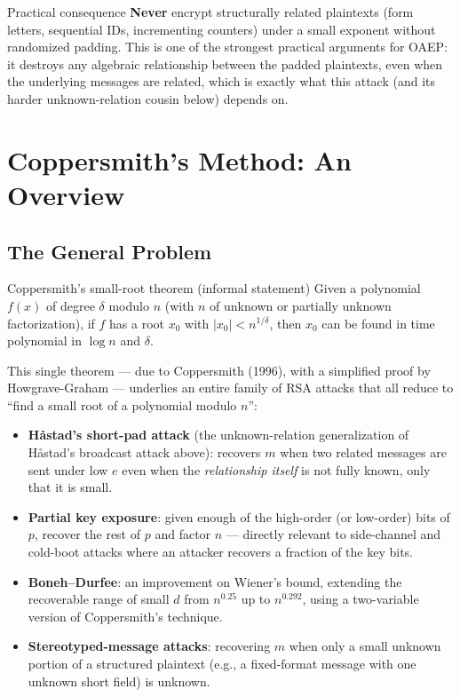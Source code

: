 \begin{warnbox}{Practical consequence}
\textbf{Never} encrypt structurally related plaintexts (form letters, sequential IDs, incrementing counters) under a small exponent without randomized padding. This is one of the strongest practical arguments for OAEP: it destroys any algebraic relationship between the padded plaintexts, even when the underlying messages are related, which is exactly what this attack (and its harder unknown-relation cousin below) depends on.
\end{warnbox}

\newpage
\section{Coppersmith's Method: An Overview}\label{sec:coppersmith}

\subsection{The General Problem}

\begin{keybox}{Coppersmith's small-root theorem (informal statement)}
Given a polynomial $f(x)$ of degree $\delta$ modulo $n$ (with $n$ of unknown or partially unknown factorization), if $f$ has a root $x_0$ with $|x_0| < n^{1/\delta}$, then $x_0$ can be found in time polynomial in $\log n$ and $\delta$.
\end{keybox}

This single theorem — due to Coppersmith (1996), with a simplified proof by Howgrave-Graham — underlies an entire family of RSA attacks that all reduce to ``find a small root of a polynomial modulo $n$'':

\begin{itemize}
\item \textbf{Håstad's short-pad attack} (the unknown-relation generalization of Håstad's broadcast attack above): recovers $m$ when two related messages are sent under low $e$ even when the \emph{relationship itself} is not fully known, only that it is small.
\item \textbf{Partial key exposure}: given enough of the high-order (or low-order) bits of $p$, recover the rest of $p$ and factor $n$ — directly relevant to side-channel and cold-boot attacks where an attacker recovers a fraction of the key bits.
\item \textbf{Boneh--Durfee}: an improvement on Wiener's bound, extending the recoverable range of small $d$ from $n^{0.25}$ up to $n^{0.292}$, using a two-variable version of Coppersmith's technique.
\item \textbf{Stereotyped-message attacks}: recovering $m$ when only a small unknown portion of a structured plaintext (e.g., a fixed-format message with one unknown short field) is unknown.
\end{itemize}

